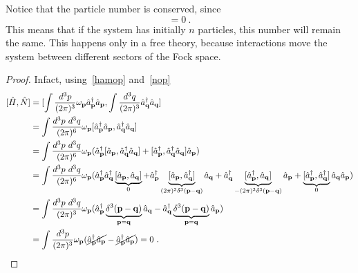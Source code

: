     Notice that the particle number is conserved, since
    \begin{equation*}
        [\hat H, \hat N] = 0 ~.
    \end{equation*}
    This means that if the system has initially $n$ particles, this number will remain the same. This happens only in a free theory, because interactions move the system between different sectors of the Fock space.
    \begin{proof}
        Infact, using~\eqref{hamop} and~\eqref{nop}
        \begin{equation*}
        \begin{aligned}
            [\hat H, \hat N] & = [\int \frac{d^3 p}{(2\pi)^3} \omega_{\mathbf p} \hat a_{\mathbf p}^\dagger \hat a_{\mathbf p}, \int \frac{d^3 q}{(2\pi)^3} \hat a_{\mathbf q}^\dagger \hat a_{\mathbf q}] \\ & = \int \frac{d^3 p ~ d^3q}{(2\pi)^6} \omega_{\mathbf p} [\hat a_{\mathbf p}^\dagger \hat a_{\mathbf p}, \hat a_{\mathbf q}^\dagger \hat a_{\mathbf q}] \\ & = \int \frac{d^3 p ~ d^3q}{(2\pi)^6} \omega_{\mathbf p} ( \hat a_{\mathbf p}^\dagger [\hat a_{\mathbf p}, \hat a_{\mathbf q}^\dagger \hat a_{\mathbf q}] + [\hat a_{\mathbf p}^\dagger, \hat a_{\mathbf q}^\dagger \hat a_{\mathbf q}] \hat a_{\mathbf p} ) \\ & = \int \frac{d^3 p ~ d^3q}{(2\pi)^6} \omega_{\mathbf p} ( \hat a_{\mathbf p}^\dagger \hat a_{\mathbf q}^\dagger \underbrace{[\hat a_{\mathbf p}, \hat a_{\mathbf q}]}_0 + \hat a_{\mathbf p}^\dagger \underbrace{[\hat a_{\mathbf p}, \hat a_{\mathbf q}^\dagger]}_{(2\pi)^3 \delta^3 (\mathbf p - \mathbf q)}  \hat a_{\mathbf q} + \hat a_{\mathbf q}^\dagger \underbrace{[\hat a_{\mathbf p}^\dagger, \hat a_{\mathbf q}]}_{- (2\pi)^3 \delta^3 (\mathbf p - \mathbf q)} \hat a_{\mathbf p} + \underbrace{[\hat a_{\mathbf p}^\dagger, \hat a_{\mathbf q}^\dagger]}_0 \hat a_{\mathbf q} \hat a_{\mathbf p} ) \\ & = \int \frac{d^3 p ~ d^3q}{(2\pi)^3} \omega_{\mathbf p} (\hat a_{\mathbf p}^\dagger \underbrace{\delta^3 (\mathbf p - \mathbf q)}_{\mathbf p = \mathbf q} \hat a_{\mathbf q} - \hat a_{\mathbf q}^\dagger \underbrace{\delta^3 (\mathbf p - \mathbf q)}_{\mathbf p = \mathbf q} \hat a_{\mathbf p} ) \\ & = \int \frac{d^3 p}{(2\pi)^3} \omega_{\mathbf p} (\cancel{\hat a_{\mathbf p}^\dagger \hat a_{\mathbf p}} - \cancel{\hat a_{\mathbf p}^\dagger \hat a_{\mathbf p}} ) = 0 ~.
        \end{aligned}
        \end{equation*}
    \end{proof}

